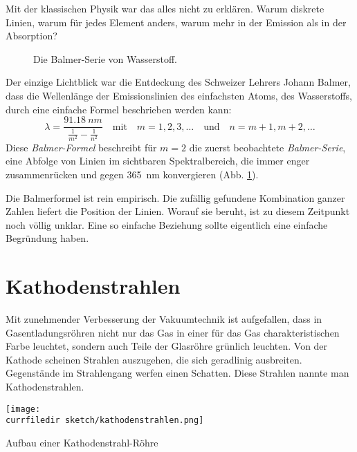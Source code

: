 Mit der klassischen Physik war das alles nicht zu erklären. Warum diskrete Linien, warum für jedes Element anders, warum mehr in der Emission als in der Absorption?


\begin{figure}
    \pgfspectra[width=\textwidth, element=H,back=visible40, gamma=.6,axis, axis step=50,axis ticks=4,begin=300,end=750,
    axis label text={Wellenlänge $\lambda$ (nm)},axis label position=right, UVcolor=white, IRcolor=white]
    
    \caption{Die Balmer-Serie von Wasserstoff.}
    \label{fig:1_balmer}
    \end{figure}

Der einzige Lichtblick war die Entdeckung des Schweizer Lehrers Johann Balmer, dass die Wellenlänge der Emissionslinien des einfachsten Atoms, des Wasserstoffs, durch eine einfache Formel beschrieben werden kann:
\begin{equation}
    \lambda = \frac{\SI{91.18}{nm}}{ 
       \frac{1}{m^2} - \frac{1}{n^2} 
    }
    \quad \text{mit} \quad m = 1,2, 3, \dots \quad \text{und} \quad n = m+1, m+2, \dots
\end{equation}
Diese \emph{Balmer-Formel} beschreibt für $m=2$ die zuerst beobachtete \emph{Balmer-Serie}, eine Abfolge von Linien im sichtbaren Spektralbereich, die immer enger zusammenrücken und gegen 365~nm konvergieren (Abb. \ref{fig:1_balmer}).

Die Balmerformel ist rein empirisch. Die zufällig gefundene Kombination ganzer Zahlen liefert die Position der Linien. Worauf sie beruht, ist zu diesem Zeitpunkt noch völlig unklar. Eine so einfache Beziehung sollte eigentlich eine einfache Begründung haben.


\section{Kathodenstrahlen}

Mit zunehmender Verbesserung der Vakuumtechnik ist aufgefallen, dass in Gasentladungsröhren nicht nur das Gas in einer für das Gas charakteristischen Farbe leuchtet, sondern auch Teile der Glasröhre grünlich leuchten.  Von der Kathode scheinen Strahlen auszugehen, die sich geradlinig ausbreiten. Gegenstände im Strahlengang werfen einen Schatten. Diese Strahlen nannte man Kathodenstrahlen.

\begin{marginfigure}
    \texttt{[image: \\currfiledir sketch/kathodenstrahlen.png]}
    \caption{Aufbau einer Kathodenstrahl-Röhre}
\end{marginfigure}

